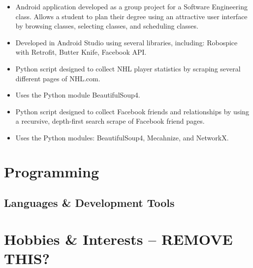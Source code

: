\documentclass[11pt,letterpaper,sans]{moderncv}        %
\begin{document}
{
  \begin{itemize}
    \item Android application developed as a group project for a Software Engineering class. Allows a student to plan their degree using an attractive user interface by browsing classes, selecting classes, and scheduling classes.
    \item Developed in Android Studio using several libraries, including: Robospice with Retrofit, Butter Knife, Facebook API.
  \end{itemize}
}
{
  \begin{itemize}
    \item Python script designed to collect NHL player statistics by scraping several different pages of NHL.com.
    \item Uses the Python module BeautifulSoup4.
  \end{itemize}
}
{
  \begin{itemize}
    \item Python script designed to collect Facebook friends and relationships by using a recursive, depth-first search scrape of Facebook friend pages.
    \item Uses the Python modules: BeautifulSoup4, Mecahnize, and NetworkX.
  \end{itemize}
}

\section{Programming}
\subsection{Languages \& Development Tools}


\section{Hobbies \& Interests -- REMOVE THIS?}
\end{document}
